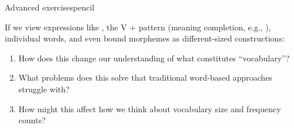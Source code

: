 \begin{tblsframedsymbol}{Advanced exercises}{pencil}
\begin{enumerate}[noitemsep, leftmargin=*]
    If we view expressions like , the V +  pattern (meaning completion, e.g., ), individual words, and even bound morphemes as different-sized constructions:
    \begin{enumerate}[nosep]
        \item How does this change our understanding of what constitutes \enquote{vocabulary}?
        \item What problems does this solve that traditional word-based approaches struggle with?
        \item How might this affect how we think about vocabulary size and frequency counts?
    \end{enumerate}
\end{enumerate}
\end{tblsframedsymbol}
